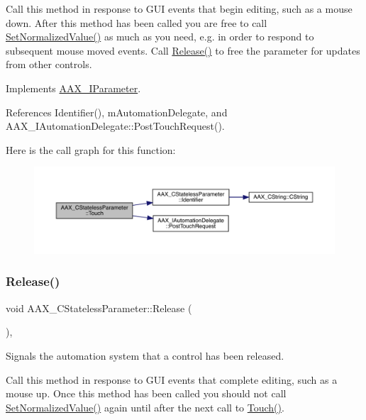 Call this method in response to G\+UI events that begin editing, such as a mouse down. After this method has been called you are free to call \mbox{\hyperlink{a01541_a921a21bd3a68cdcf6c9d5903f3d18dd6}{Set\+Normalized\+Value()}} as much as you need, e.\+g. in order to respond to subsequent mouse moved events. Call \mbox{\hyperlink{a01541_a815f21974e1a75eb9fdcc5cf3e0704c4}{Release()}} to free the parameter for updates from other controls. 

Implements \mbox{\hyperlink{a01857_a74c71243313f9d817c8bcb77550969aa}{A\+A\+X\+\_\+\+I\+Parameter}}.



References Identifier(), m\+Automation\+Delegate, and A\+A\+X\+\_\+\+I\+Automation\+Delegate\+::\+Post\+Touch\+Request().

Here is the call graph for this function\+:
\nopagebreak
\begin{figure}[H]
\begin{center}
\leavevmode
\includegraphics[width=350pt]{a01541_a91eda962cdbf1e211a396240c23c0330_cgraph}
\end{center}
\end{figure}
\mbox{\label{a01541_a815f21974e1a75eb9fdcc5cf3e0704c4}} 
\subsubsection{\texorpdfstring{Release()}{Release()}}
{\footnotesize\ttfamily void A\+A\+X\+\_\+\+C\+Stateless\+Parameter\+::\+Release (\begin{DoxyParamCaption}{ }\end{DoxyParamCaption})\hspace{0.3cm}{\ttfamily [inline]}, {\ttfamily [virtual]}}



Signals the automation system that a control has been released. 

Call this method in response to G\+UI events that complete editing, such as a mouse up. Once this method has been called you should not call \mbox{\hyperlink{a01541_a921a21bd3a68cdcf6c9d5903f3d18dd6}{Set\+Normalized\+Value()}} again until after the next call to \mbox{\hyperlink{a01541_a91eda962cdbf1e211a396240c23c0330}{Touch()}}. 

